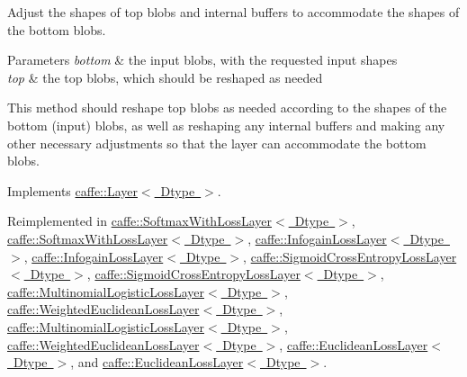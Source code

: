 Adjust the shapes of top blobs and internal buffers to accommodate the shapes of the bottom blobs. 


\begin{DoxyParams}{Parameters}
{\em bottom} & the input blobs, with the requested input shapes \\
\hline
{\em top} & the top blobs, which should be reshaped as needed\\
\hline
\end{DoxyParams}
This method should reshape top blobs as needed according to the shapes of the bottom (input) blobs, as well as reshaping any internal buffers and making any other necessary adjustments so that the layer can accommodate the bottom blobs. 

Implements \mbox{\hyperlink{classcaffe_1_1_layer_a7fe981e8af8d93d587acf2a952be563d}{caffe\+::\+Layer$<$ Dtype $>$}}.



Reimplemented in \mbox{\hyperlink{classcaffe_1_1_softmax_with_loss_layer_a2821b89b0f46a5e2ddaccb2708ab237b}{caffe\+::\+Softmax\+With\+Loss\+Layer$<$ Dtype $>$}}, \mbox{\hyperlink{classcaffe_1_1_softmax_with_loss_layer_ad8f5d429254deaebe4ea5f14bfa0d4d0}{caffe\+::\+Softmax\+With\+Loss\+Layer$<$ Dtype $>$}}, \mbox{\hyperlink{classcaffe_1_1_infogain_loss_layer_a83ed478450bc7f629499fed37f654c5c}{caffe\+::\+Infogain\+Loss\+Layer$<$ Dtype $>$}}, \mbox{\hyperlink{classcaffe_1_1_infogain_loss_layer_aa2903026b3886816270deb038a463759}{caffe\+::\+Infogain\+Loss\+Layer$<$ Dtype $>$}}, \mbox{\hyperlink{classcaffe_1_1_sigmoid_cross_entropy_loss_layer_a305423abeea4bd1652ff7e696aaba808}{caffe\+::\+Sigmoid\+Cross\+Entropy\+Loss\+Layer$<$ Dtype $>$}}, \mbox{\hyperlink{classcaffe_1_1_sigmoid_cross_entropy_loss_layer_a4199eb0668451022f8da20ebca129eb3}{caffe\+::\+Sigmoid\+Cross\+Entropy\+Loss\+Layer$<$ Dtype $>$}}, \mbox{\hyperlink{classcaffe_1_1_multinomial_logistic_loss_layer_a979be47987712c02dfb57a88b2a69f11}{caffe\+::\+Multinomial\+Logistic\+Loss\+Layer$<$ Dtype $>$}}, \mbox{\hyperlink{classcaffe_1_1_weighted_euclidean_loss_layer_a98e3de49ab49d66b8e3ebfe3aa4fbe20}{caffe\+::\+Weighted\+Euclidean\+Loss\+Layer$<$ Dtype $>$}}, \mbox{\hyperlink{classcaffe_1_1_multinomial_logistic_loss_layer_afd5162d1fc8be1a4abdf1afaa96519f8}{caffe\+::\+Multinomial\+Logistic\+Loss\+Layer$<$ Dtype $>$}}, \mbox{\hyperlink{classcaffe_1_1_weighted_euclidean_loss_layer_ac9b915b132fb539ffdd610992c507974}{caffe\+::\+Weighted\+Euclidean\+Loss\+Layer$<$ Dtype $>$}}, \mbox{\hyperlink{classcaffe_1_1_euclidean_loss_layer_a9cbe90ea0130c31bd5b9419a1bbaa555}{caffe\+::\+Euclidean\+Loss\+Layer$<$ Dtype $>$}}, and \mbox{\hyperlink{classcaffe_1_1_euclidean_loss_layer_ab7f1b879898ffba67cf5035f6a56d8eb}{caffe\+::\+Euclidean\+Loss\+Layer$<$ Dtype $>$}}.

